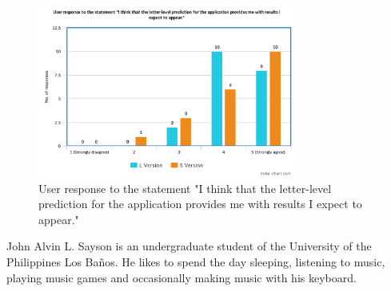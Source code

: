 \documentclass[journal]{./IEEE/IEEEtran}
\begin{document}
\begin{figure}[!ht]
\begin{center}

\includegraphics[width=85mm]{images/s12.png}
\caption{User response to the statement "I think that the letter-level prediction for the application provides me with results I expect to appear."}

\end{center}
\end{figure}



\nocite{*}

\begin{biography}
{John Alvin L. Sayson} is an undergraduate student of the University of the Philippines Los Ba\~{n}os. He likes to spend the day sleeping, listening to music, playing music games and occasionally making music with his keyboard.
\end{biography}
\end{document}
